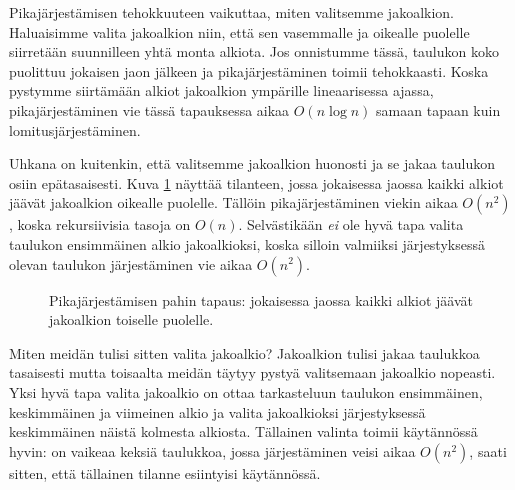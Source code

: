Pikajärjestämisen tehokkuuteen vaikuttaa, miten valitsemme jakoalkion.
Haluaisimme valita jakoalkion niin, että sen vasemmalle ja oikealle
puolelle siirretään suunnilleen yhtä monta alkiota.
Jos onnistumme tässä, taulukon koko puolittuu jokaisen jaon jälkeen
ja pikajärjestäminen toimii tehokkaasti.
Koska pystymme siirtämään alkiot jakoalkion ympärille
lineaarisessa ajassa, pikajärjestäminen vie tässä tapauksessa aikaa
$O(n \log n)$ samaan tapaan kuin lomitusjärjestäminen.

Uhkana on kuitenkin, että valitsemme jakoalkion huonosti ja se jakaa
taulukon osiin epätasaisesti.
Kuva \ref{fig:pikpah} näyttää tilanteen, jossa jokaisessa jaossa
kaikki alkiot jäävät jakoalkion oikealle puolelle.
Tällöin pikajärjestäminen viekin aikaa $O(n^2)$, koska rekursiivisia
tasoja on $O(n)$.
Selvästikään \emph{ei} ole hyvä tapa valita taulukon ensimmäinen
alkio jakoalkioksi, koska silloin valmiiksi järjestyksessä olevan
taulukon järjestäminen vie aikaa $O(n^2)$.
\begin{figure}
\center
{}
\caption{Pikajärjestämisen pahin tapaus: jokaisessa jaossa kaikki
alkiot jäävät jakoalkion toiselle puolelle.}
\label{fig:pikpah}
\end{figure}

Miten meidän tulisi sitten valita jakoalkio?
Jakoalkion tulisi jakaa taulukkoa tasaisesti mutta toisaalta
meidän täytyy pystyä valitsemaan jakoalkio nopeasti.
Yksi hyvä tapa valita jakoalkio on ottaa tarkasteluun
taulukon ensimmäinen, keskimmäinen ja viimeinen alkio ja valita
jakoalkioksi järjestyksessä keskimmäinen näistä kolmesta alkiosta.
Tällainen valinta toimii käytännössä hyvin:
on vaikeaa keksiä taulukkoa, jossa järjestäminen veisi aikaa $O(n^2)$,
saati sitten, että tällainen tilanne esiintyisi käytännössä.

